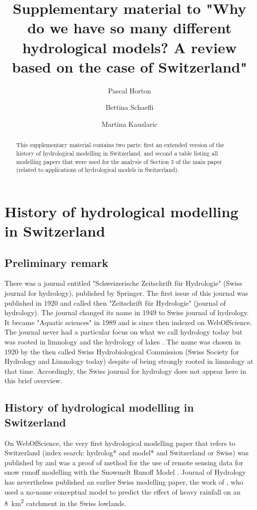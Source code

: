 \documentclass[10pt,a4paper]{article}
\title{Supplementary material to "Why do we have so many different hydrological models? A review based on the case of Switzerland"}
\author[1]{Pascal Horton}
\author[1]{Bettina Schaefli}
\author[1]{Martina Kauzlaric}
\affil[1]{Institute of Geography \& Oeschger Centre for Climate Change Research, University of Bern, Bern, Switzerland}
\date{}
\begin{document}
	
\maketitle

\begin{abstract}
	This supplementary material contains two parts: first an extended version of the history of hydrological modelling in Switzerland, and second a table listing all modelling papers that were used for the analysis of Section 3 of the main paper (related to applications of hydrological models in Switzerland).
\end{abstract}



\section{History of hydrological modelling in Switzerland}


\subsection{Preliminary remark}

There was a journal entitled "Schweizerische Zeitschrift für Hydrologie" (Swiss journal for hydrology), published by Springer. The first issue of this journal was published in 1920 and called then "Zeitschrift für Hydrologie" (journal of hydrology). The journal changed its name in 1949 to Swiss journal of hydrology. It became "Aquatic sciences" in 1989 \citep{bossard1989} and is since then indexed on WebOfScience. The journal never had a particular focus on what we call hydrology today but was rooted in limnology and the hydrology of lakes \citep{tockner2009}. The name was chosen in 1920 by the then called Swiss Hydrobiological Commission (Swiss Society for Hydrology and Limnology today) \citep{perret2001} despite of being strongly rooted in limnology at that time. Accordingly, the Swiss journal for hydrology does not appear here in this brief overview.


\subsection{History of hydrological modelling in Switzerland}

On WebOfScience, the very first hydrological modelling paper that refers to Switzerland (index search: hydrolog* and model* and Switzerland or Swiss) was published by \citet{baumgartner1986} and was a proof of method for the use of remote sensing data for snow runoff modelling with the Snowmelt Runoff Model \citep[SRM,][]{martinec1975}. Journal of Hydrology has nevertheless published an earlier Swiss modelling paper, the work of \citet{hager1984}, who used a no-name conceptual model to predict the effect of heavy rainfall on an 8~km\textsuperscript{2} catchment in the Swiss lowlands.
\end{document}
